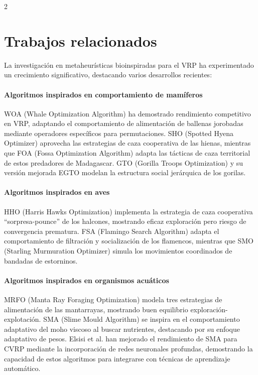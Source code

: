\documentclass[10pt,a4paper]{extarticle}
\begin{document}
\begin{multicols}{2}
\section{Trabajos relacionados}
La investigación en metaheurísticas bioinspiradas para el VRP ha experimentado un crecimiento significativo, destacando varios desarrollos recientes:

\paragraph{Algoritmos inspirados en comportamiento de mamíferos} WOA (Whale Optimization Algorithm) ha demostrado rendimiento competitivo en VRP, adaptando el comportamiento de alimentación de ballenas jorobadas mediante operadores específicos para permutaciones. SHO (Spotted Hyena Optimizer) aprovecha las estrategias de caza cooperativa de las hienas, mientras que FOA (Fossa Optimization Algorithm) adapta las tácticas de caza territorial de estos predadores de Madagascar. GTO (Gorilla Troops Optimization) y su versión mejorada EGTO modelan la estructura social jerárquica de los gorilas.

\paragraph{Algoritmos inspirados en aves} HHO (Harris Hawks Optimization) implementa la estrategia de caza cooperativa ``sorpresa-pounce'' de los halcones, mostrando eficaz exploración pero riesgo de convergencia prematura. FSA (Flamingo Search Algorithm) adapta el comportamiento de filtración y socialización de los flamencos, mientras que SMO (Starling Murmuration Optimizer) simula los movimientos coordinados de bandadas de estorninos.

\paragraph{Algoritmos inspirados en organismos acuáticos} MRFO (Manta Ray Foraging Optimization) modela tres estrategias de alimentación de las mantarrayas, mostrando buen equilibrio exploración-explotación. SMA (Slime Mould Algorithm) se inspira en el comportamiento adaptativo del moho viscoso al buscar nutrientes, destacando por su enfoque adaptativo de pesos. Elsisi et al. han mejorado el rendimiento de SMA para CVRP mediante la incorporación de redes neuronales profundas, demostrando la capacidad de estos algoritmos para integrarse con técnicas de aprendizaje automático.


\end{multicols}
\end{document}

